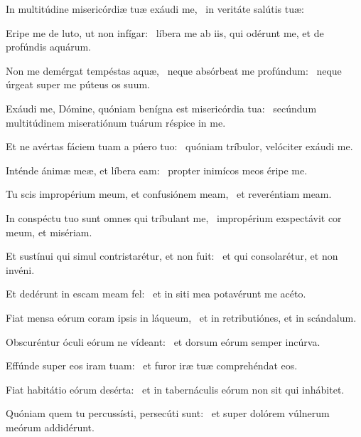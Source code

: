 \item In multitúdine misericórdiæ tuæ exáudi me,~\psstar{} in veritáte salútis tuæ:

\item Eripe me de luto, ut non infígar:~\psstar{} líbera me ab iis, qui odérunt me, et de profúndis aquárum.

\item Non me demérgat tempéstas aquæ,~\pscross{} neque absórbeat me profúndum:~\psstar{} neque úrgeat super me púteus os suum.

\item Exáudi me, Dómine, quóniam benígna est misericórdia tua:~\psstar{} secúndum multitúdinem miseratiónum tuárum réspice in me.

\item Et ne avértas fáciem tuam a púero tuo:~\psstar{} quóniam tríbulor, velóciter exáudi me.

\item Inténde ánimæ meæ, et líbera eam:~\psstar{} propter inimícos meos éripe me.

\item Tu scis impropérium meum, et confusiónem meam,~\psstar{} et reveréntiam meam.

\item In conspéctu tuo sunt omnes qui tríbulant me,~\psstar{} impropérium exspectávit cor meum, et misériam.

\item Et sustínui qui simul contristarétur, et non fuit:~\psstar{} et qui consolarétur, et non invéni.

\item Et dedérunt in escam meam fel:~\psstar{} et in siti mea potavérunt me acéto.

\item Fiat mensa eórum coram ipsis in láqueum,~\psstar{} et in retributiónes, et in scándalum.

\item Obscuréntur óculi eórum ne vídeant:~\psstar{} et dorsum eórum semper incúrva.

\item Effúnde super eos iram tuam:~\psstar{} et furor iræ tuæ comprehéndat eos.

\item Fiat habitátio eórum desérta:~\psstar{} et in tabernáculis eórum non sit qui inhábitet.

\item Quóniam quem tu percussísti, persecúti sunt:~\psstar{} et super dolórem vúlnerum meórum addidérunt.

